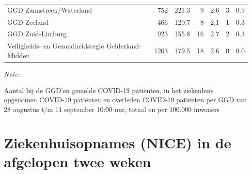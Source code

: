 \documentclass[
  english,
  man,floatsintext]{apa6}
\begin{document}
\begin{table}
\begin{threeparttable}
\begin{tabular}{lrrrrrr}
GGD Zaanstreek/Waterland & 752 & 221.3 & 9 & 2.6 & 3 & 0.9\\
GGD Zeeland & 466 & 120.7 & 8 & 2.1 & 1 & 0.3\\
GGD Zuid-Limburg & 923 & 155.8 & 16 & 2.7 & 2 & 0.3\\
Veiligheids- en Gezondheidsregio Gelderland-Midden & 1263 & 179.5 & 18 & 2.6 & 0 & 0.0\\
\bottomrule
\end{tabular}
\begin{tablenotes}
\item \textit{Note: } 
\item Aantal bij de GGD’en gemelde COVID-19 patiënten, in het ziekenhuis opgenomen COVID-19 patiënten en overleden COVID-19 patiënten per GGD van 28 augustus t/m 11 september 10:00 uur, totaal en per 100.000 inwoners
\end{tablenotes}
\end{threeparttable}
\endgroup{}
\end{table}

\newpage

\hypertarget{ziekenhuisopnames-nice-in-de-afgelopen-twee-weken}{%
\section{Ziekenhuisopnames (NICE) in de afgelopen twee weken}\label{ziekenhuisopnames-nice-in-de-afgelopen-twee-weken}}
\end{document}
